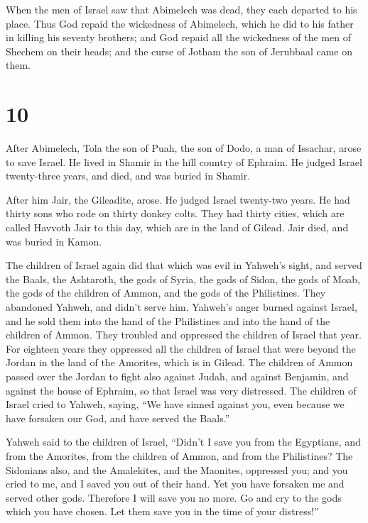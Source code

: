  When the men of Israel saw that Abimelech was dead, they
each departed to his place.  Thus God repaid the
wickedness of Abimelech, which he did to his father in killing his
seventy brothers;  and God repaid all the wickedness of
the men of Shechem on their heads; and the curse of Jotham the son of
Jerubbaal came on them.

\hypertarget{section-9}{%
\section{10}\label{section-9}}

 After Abimelech, Tola the son of Puah, the son of Dodo, a
man of Issachar, arose to save Israel. He lived in Shamir in the hill
country of Ephraim.  He judged Israel twenty-three years,
and died, and was buried in Shamir.

 After him Jair, the Gileadite, arose. He judged Israel
twenty-two years.  He had thirty sons who rode on thirty
donkey colts. They had thirty cities, which are called Havvoth Jair to
this day, which are in the land of Gilead.  Jair died, and
was buried in Kamon.

 The children of Israel again did that which was evil in
Yahweh's sight, and served the Baals, the Ashtaroth, the gods of Syria,
the gods of Sidon, the gods of Moab, the gods of the children of Ammon,
and the gods of the Philistines. They abandoned Yahweh, and didn't serve
him.  Yahweh's anger burned against Israel, and he sold
them into the hand of the Philistines and into the hand of the children
of Ammon.  They troubled and oppressed the children of
Israel that year. For eighteen years they oppressed all the children of
Israel that were beyond the Jordan in the land of the Amorites, which is
in Gilead.  The children of Ammon passed over the Jordan
to fight also against Judah, and against Benjamin, and against the house
of Ephraim, so that Israel was very distressed.  The
children of Israel cried to Yahweh, saying, ``We have sinned against
you, even because we have forsaken our God, and have served the Baals.''

 Yahweh said to the children of Israel, ``Didn't I save
you from the Egyptians, and from the Amorites, from the children of
Ammon, and from the Philistines?  The Sidonians also, and
the Amalekites, and the Maonites, oppressed you; and you cried to me,
and I saved you out of their hand.  Yet you have forsaken
me and served other gods. Therefore I will save you no more.
 Go and cry to the gods which you have chosen. Let them
save you in the time of your distress!''


